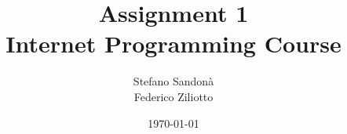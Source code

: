 \title{
Assignment 1 \\
Internet Programming Course
}
\author{
Stefano Sandonà \\
Federico Ziliotto
}
\date{\today}







\linespread{1.2}
\setlength{\parindent}{14pt}   %


\ifxetex
{}
\setsansfont{Droid Sans}
\setmonofont{Droid Sans Mono}
\else
  \usepackage[T1]{fontenc}
  \usepackage{newtxtext,newtxmath}
\fi


\newcommand\mycommfont[1]{\scriptsize\ttfamily\textcolor{blue}{#1}}

\makeatletter
\renewcommand{\listalgorithmcfname}{Lista degli Algoritmi}%
\renewcommand{\algorithmcfname}{Algoritmo}%
\renewcommand{\algocf@typo}{}%
\renewcommand{\@algocf@procname}{Procedura}
\renewcommand{\@algocf@funcname}{Funzione}
\makeatother




